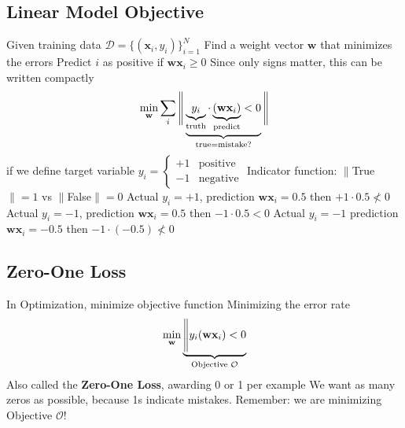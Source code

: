 \documentclass{article}
\renewcommand{\vec}[1]{%
	\mathbf{#1}%
}
\begin{document}
	\subsection{Linear Model Objective}
	\begin{outline}
		\1 Given training data $\mathcal{D} = \{(\vec{x}_i, y_i)\}_{i=1}^N$
		\1 Find a weight vector $\vec{w}$ that minimizes the errors
		\1 Predict $i$ as positive if $\vec{w}\vec{x}_i \geq 0$
		\1 Since only signs matter, this can be written compactly
		\[ \min_{\vec{w}} \sum_i \Bigg\| \underbrace{\underbrace{y_i}_{\text{truth}} \cdot \underbrace{(\vec{w}\vec{x}_i)}_{\text{predict}} < 0}_{\text{true=mistake?}} \Bigg\| \]
		if we define target variable $y_i = \begin{cases} +1 & \text{positive}\\
		-1 & \text{negative} \end{cases}$
		\1 Indicator function: $\|$True$\| = 1$ vs $\|$False$\| = 0$
		\2 Actual $y_i = +1$, prediction $\vec{w}\vec{x}_i = 0.5$ then $+1 \cdot 0.5 \nless 0$
		\2 Actual $y_i = -1$, prediction $\vec{w}\vec{x}_i = 0.5$ then $-1 \cdot 0.5 < 0$
		\2 Actual $y_i = -1$ prediction $\vec{w}\vec{x}_i = -0.5$ then $-1 \cdot (-0.5) \nless 0$
	\end{outline}
	\subsection{Zero-One Loss}
	\begin{outline}
		\1 In Optimization, minimize objective function
		\1 Minimizing the error rate
		\[ \min_\vec{w} \underbrace{\Bigg\| y_i(\vec{w}\vec{x}_i) < 0}_{\text{Objective } \mathcal{O}} \]
		\1 Also called the \textbf{Zero-One Loss}, awarding 0 or 1 per example
		\1 We want as many zeros as possible, because 1s indicate mistakes. Remember: we are minimizing Objective $\mathcal{O}$!
	\end{outline}
\end{document}

